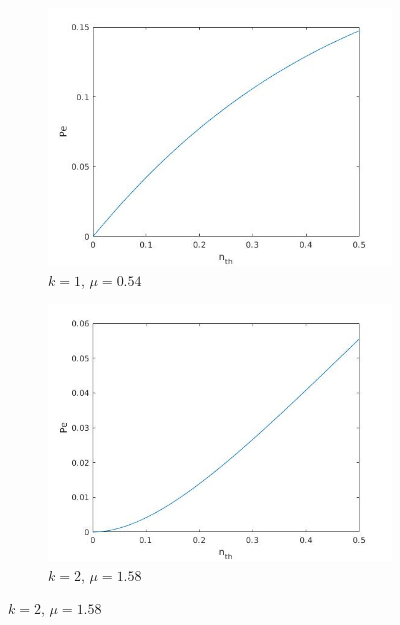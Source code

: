 \documentclass[a4paper,11pt]{article}
\begin{document}
        \begin{figure}[ht]
            \caption{Effetto del rumore termico}
            \begin{subfigure}{0.45\textwidth}
                \includegraphics[width=\linewidth]{noiseEffectk1.jpg}
                \caption{$k=1$, $\mu=0.54$}
            \end{subfigure}
            \hspace*{\fill}
            \begin{subfigure}{0.45\textwidth}
                \includegraphics[width=\linewidth]{noiseEffectk2_zero2.jpg}
                \caption{$k=2$, $\mu=1.58$}
            \end{subfigure}
            \label{fig:3}
        \end{figure}
\end{document}
